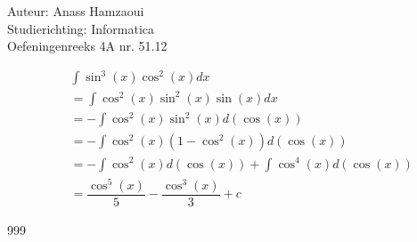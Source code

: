 \documentclass[a4paper]{article}
\begin{document}
  
\noindent \large Auteur: Anass Hamzaoui \\
\noindent \large Studierichting: Informatica \\
\noindent \large Oefeningenreeks 4A nr. 51.12 \\

\medskip

\normalsize

\begin{eqnarray*}
    && \displaystyle\int \sin^3(x) \cos^2(x)  dx \\
    && = \displaystyle\int \cos^2(x) \sin^2(x) \sin(x)  dx \\
    && = - \displaystyle\int \cos^2(x) \sin^2(x)  d(\cos(x)) \\
    && = - \displaystyle\int \cos^2(x) \left(1 - \cos^2(x)\right)  d(\cos(x)) \\
    && = - \displaystyle\int \cos^2(x)  d(\cos(x)) + \displaystyle\int \cos^4(x)  d(\cos(x)) \\
    && = \dfrac{\cos^5(x)}{5} - \dfrac{\cos^3(x)}{3} + c
\end{eqnarray*}

\begin{thebibliography}{999}
\end{thebibliography}
\end{document}

